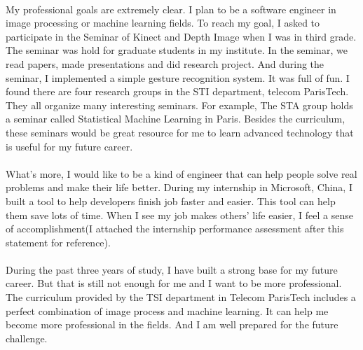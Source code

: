 \documentclass[a4paper]{article}
\begin{document}
\paragraph{}
My professional goals are extremely clear. I plan to be a software engineer in image processing or machine learning fields. To reach my goal,  I asked to participate in the Seminar of Kinect and Depth Image when I was in third grade. The seminar was hold for graduate students in my institute. In the seminar, we read papers, made presentations and did research project. And during the seminar, I implemented a simple gesture recognition system. It was full of fun. I found there are four research groups in the STI department, telecom ParisTech. They all organize many interesting seminars. For example, The STA group holds a seminar called Statistical Machine Learning in Paris. Besides the curriculum, these seminars would be great resource for me to learn advanced technology that is useful for my future career. 
\paragraph{}
What's more, I would like to be a kind of engineer that can help people solve real problems and make their life better. During my internship in Microsoft, China, I built a tool to help developers finish job faster and easier. This tool can help them save lots of time. When I see my job makes others' life easier, I feel a sense of accomplishment(I attached the internship performance assessment after this statement for reference).
\paragraph{}   
During the past three years of study, I have built a strong base for my future career. But that is still not enough for me and I want to be more professional. The curriculum provided by the TSI department in Telecom ParisTech includes a perfect combination of image process and machine learning. It can help me become more professional in the fields. And I am well prepared for the future challenge.
\end{document}
